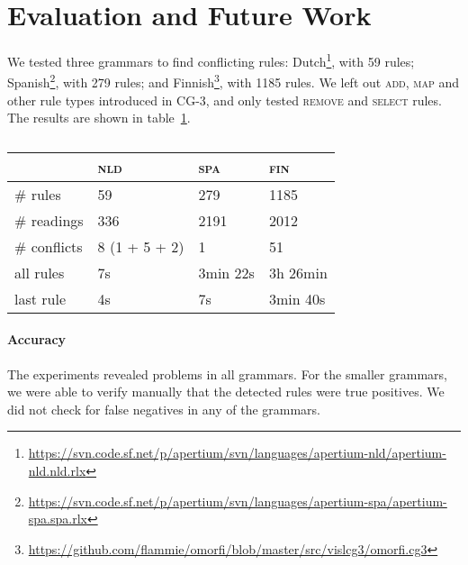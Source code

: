\section{Evaluation and Future Work}
\label{sec:eval}

We tested three grammars to find conflicting rules: 
Dutch\footnote{\url{https://svn.code.sf.net/p/apertium/svn/languages/apertium-nld/apertium-nld.nld.rlx}},
with 59 rules; 
Spanish\footnote{\url{https://svn.code.sf.net/p/apertium/svn/languages/apertium-spa/apertium-spa.spa.rlx}},
with 279 rules; and 
Finnish\footnote{\url{https://github.com/flammie/omorfi/blob/master/src/vislcg3/omorfi.cg3}},
with 1185 rules. We left out \textsc{add}, \textsc{map} and other rule
types introduced in CG-3, and only tested \textsc{remove} and \textsc{select} rules.
The results are shown in table~\ref{table:res}. 


\begin{table}[]
\centering
\begin{tabular}{|l|l|l|l|}
\hline
              & \textsc{nld}  & \textsc{spa}  & \textsc{fin}  \\ \hline
\# rules      & 59              & 279      & 1185     \\ \hline
\# readings   & 336             & 2191     & 2012    \\ \hline
\# conflicts  & 8 (1 + 5 + 2)   & 1        & 51    \\ \hline
\clock{} all rules       & 7s              & 3min 22s    & 3h 26min    \\ \hline
\clock{} last rule       & 4s              & 7s          & 3min 40s    \\ \hline


\end{tabular}
\caption{}
\label{table:res}
\end{table}

\paragraph{Accuracy} 
The experiments revealed problems in all grammars. For the smaller
grammars, we were able to verify manually that the detected rules were
true positives.
We did not check for false negatives in any of the grammars.

